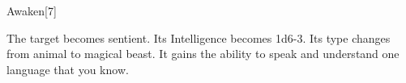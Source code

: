 \begin{spellsection}{Awaken}[7]
    \begin{spellheader}
    \end{spellheader}
    \begin{spellcontent}
        \begin{spelltargetinginfo}
        \end{spelltargetinginfo}
        \begin{spelleffects}

            \spelleffect The target becomes sentient. Its Intelligence becomes 1d6-3. Its type changes from animal to magical beast. It gains the ability to speak and understand one language that you know.
        \end{spelleffects}
    \end{spellcontent}
    \begin{spellfooter}
    \end{spellfooter}
\end{spellsection}


